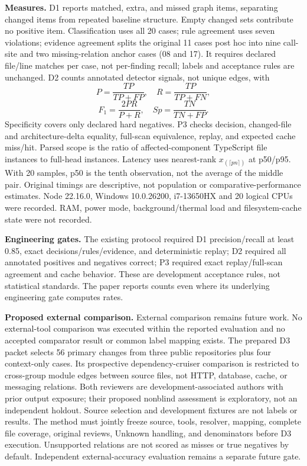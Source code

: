 \textbf{Measures.} D1 reports matched, extra, and missed graph items, separating changed items from repeated baseline structure. Empty changed sets contribute no positive item. Classification uses all 20 cases; rule agreement uses seven violations; evidence agreement splits the original 11 cases post hoc into nine call-site and two missing-relation anchor cases (08 and 17). It requires declared file/line matches per case, not per-finding recall; labels and acceptance rules are unchanged. D2 counts annotated detector signals, not unique edges, with
\[
P=\frac{TP}{TP+FP},\quad R=\frac{TP}{TP+FN},
\]
\[
F_1=\frac{2PR}{P+R},\quad Sp=\frac{TN}{TN+FP}.
\]
Specificity covers only declared hard negatives. P3 checks decision, changed-file and architecture-delta equality, full-scan equivalence, replay, and expected cache miss/hit. Parsed scope is the ratio of affected-component TypeScript file instances to full-head instances. Latency uses nearest-rank $x_{(\lceil pn\rceil)}$ at p50/p95. With 20 samples, p50 is the tenth observation, not the average of the middle pair. Original timings are descriptive, not population or comparative-performance estimates. Node 22.16.0, Windows 10.0.26200, i7-13650HX and 20 logical CPUs were recorded. RAM, power mode, background/thermal load and filesystem-cache state were not recorded.

\textbf{Engineering gates.} The existing protocol required D1 precision/recall at least 0.85, exact decisions/rules/evidence, and deterministic replay; D2 required all annotated positives and negatives correct; P3 required exact replay/full-scan agreement and cache behavior. These are development acceptance rules, not statistical standards. The paper reports counts even where its underlying engineering gate computes rates.

\textbf{Proposed external comparison.} External comparison remains future work. No external-tool comparison was executed within the reported evaluation and no accepted comparator result or common label mapping exists. The prepared D3 packet selects 56 primary changes from three public repositories plus four context-only cases. Its prospective dependency-cruiser comparison is restricted to cross-group module edges between source files, not HTTP, database, cache, or messaging relations. Both reviewers are development-associated authors with prior output exposure; their proposed nonblind assessment is exploratory, not an independent holdout. Source selection and development fixtures are not labels or results. The method must jointly freeze source, tools, resolver, mapping, complete file coverage, original reviews, Unknown handling, and denominators before D3 execution. Unsupported relations are not scored as misses or true negatives by default. Independent external-accuracy evaluation remains a separate future gate.
